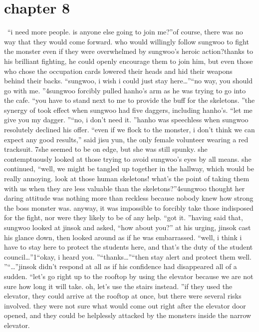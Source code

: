 \section{chapter 8}






 “i need more people.
 is anyone else going to join me?”of course, there was no way that they would come forward.
who would willingly follow sungwoo to fight the monster even if they were overwhelmed by sungwoo’s heroic action?thanks to his brilliant fighting, he could openly encourage them to join him, but even those who chose the occupation cards lowered their heads and hid their weapons behind their backs.
“sungwoo, i wish i could just stay here…”“no way, you should go with me.
”4sungwoo forcibly pulled hanho’s arm as he was trying to go into the cafe.
“you have to stand next to me to provide the buff for the skeletons.
”the synergy of  took effect when sungwoo had five daggers, including hanho’s.
“let me give you my dagger.
”“no, i don’t need it.
”hanho was speechless when sungwoo resolutely declined his offer.
“even if we flock to the monster, i don’t think we can expect any good results,” said jisu yun, the only female volunteer wearing a red tracksuit.
7she seemed to be on edge, but she was still spunky.
 she contemptuously looked at those trying to avoid sungwoo’s eyes by all means.
she continued, “well, we might be tangled up together in the hallway, which would be really annoying.
 look at those human skeletons! what’s the point of taking them with us when they are less valuable than the skeletons?”4sungwoo thought her daring attitude was nothing more than reckless because nobody knew how strong the boss monster was.
 anyway, it was impossible to forcibly take those indisposed for the fight, nor were they likely to be of any help.
“got it.
”having said that, sungwoo looked at jinsok and asked, “how about you?”
at his urging, jinsok cast his glance down, then looked around as if he was embarrassed.
“well, i think i have to stay here to protect the students here, and that’s the duty of the student council…”1“okay, i heard you.
”“thanks…”“then stay alert and protect them well.
”“…”jinsok didn’t respond at all as if his confidence had disappeared all of a sudden.
“let’s go right up to the rooftop by using the elevator because we are not sure how long it will take.
 oh, let’s use the stairs instead.
”if they used the elevator, they could arrive at the rooftop at once, but there were several risks involved.
 they were not sure what would come out right after the elevator door opened, and they could be helplessly attacked by the monsters inside the narrow elevator.

